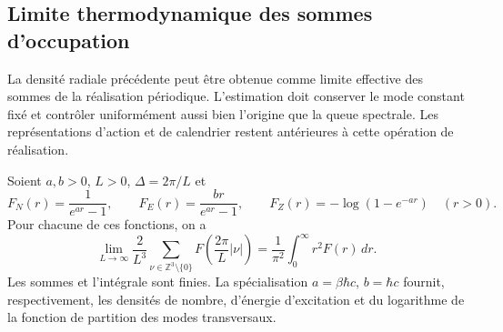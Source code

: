 \subsection{Limite thermodynamique des sommes d’occupation}
\label{v:subsec:limite-termodinamico}

La densité radiale précédente peut être obtenue comme limite effective des
sommes de la réalisation périodique. L’estimation doit conserver le mode
constant fixé et contrôler uniformément aussi bien l’origine que la queue
spectrale. Les représentations d’action et de calendrier restent antérieures
à cette opération de réalisation.

\begin{lemma}
\label{v:lem:limite-termodinamico}
Soient \(a,b>0\), \(L>0\), \(\Delta=2\pi/L\) et
\[
 F_N(r)=\frac{1}{e^{ar}-1},\qquad
 F_E(r)=\frac{br}{e^{ar}-1},\qquad
 F_Z(r)=-\log(1-e^{-ar})\quad(r>0).
\]
Pour chacune de ces fonctions, on a
\begin{equation}
 \lim_{L\to\infty}\frac{2}{L^3}
 \sum_{\nu\in\mathbb Z^3\setminus\{0\}}
 F\!\left(\frac{2\pi}{L}|\nu|\right)
 =\frac{1}{\pi^2}\int_0^\infty r^2F(r)\,dr.
 \label{v:eq:limite-modos-discretos}
\end{equation}
Les sommes et l’intégrale sont finies. La spécialisation
\(a=\beta\hbar c\), \(b=\hbar c\) fournit, respectivement,
les densités de nombre, d’énergie d’excitation et du logarithme de la fonction
de partition des modes transversaux.
\end{lemma}


